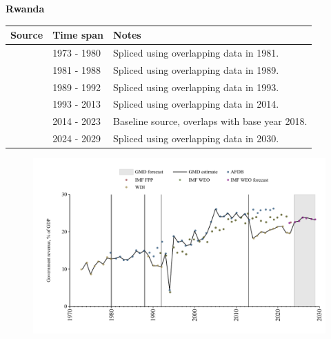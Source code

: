 \documentclass[12pt,a4paper,landscape]{article}
\begin{document}
\begin{adjustbox}{max totalsize={\paperwidth}{\paperheight},center}
\begin{minipage}[t][\textheight][t]{\textwidth}
\vspace*{0.5cm}
{}
\begin{center}
{\Large\bfseries Rwanda}
\end{center}
\vspace{0.5cm}
\begin{table}[H]
\centering
\small
\begin{tabular}{|l|l|l|}
\hline
\textbf{Source} & \textbf{Time span} & \textbf{Notes} \\
\hline
\rowcolor{white}\cite{WDI}& 1973 - 1980 &Spliced using overlapping data in 1981.\\
\rowcolor{lightgray}\cite{AFDB}& 1981 - 1988 &Spliced using overlapping data in 1989.\\
\rowcolor{white}\cite{WDI}& 1989 - 1992 &Spliced using overlapping data in 1993.\\
\rowcolor{lightgray}\cite{AFDB}& 1993 - 2013 &Spliced using overlapping data in 2014.\\
\rowcolor{white}\cite{WDI}& 2014 - 2023 &Baseline source, overlaps with base year 2018.\\
\rowcolor{lightgray}\cite{IMF_WEO_forecast}& 2024 - 2029 &Spliced using overlapping data in 2030.\\
\hline
\end{tabular}
\end{table}
\begin{figure}[H]
\centering
\includegraphics[width=\textwidth,height=0.6\textheight,keepaspectratio]{graphs/RWA_govrev_GDP.pdf}
\end{figure}
\end{minipage}
\end{adjustbox}
\end{document}
